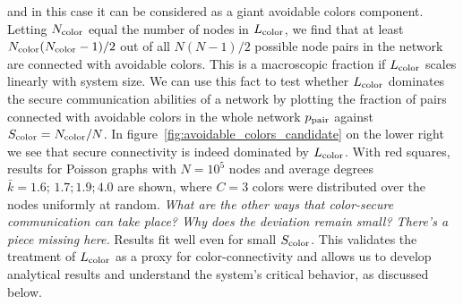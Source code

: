 \documentclass[aps, pre, twocolumn, a4paper, floatfix]{revtex4}
\newcommand{\red}{\color{red}}
\begin{document}
and in this case it can be considered as a giant avoidable colors component. 
Letting $N_{\rm color}$ equal the number of nodes in $L_{\rm color}$,
we find that at least $N_{\rm color}(N_{\rm color}-1)/2$ out of all $N(N-1)/2$ 
possible node pairs in the network are connected with avoidable colors. 
This is a macroscopic fraction if $L_{\rm color}$ scales linearly with system size. 
{\red We can use this fact to test whether $L_{\rm color}$ dominates the secure communication abilities 
of a network by plotting the fraction of pairs connected with avoidable colors in the 
whole network $p_{\rm pair}$ against $S_{\rm color}=N_{\rm color}/N$. 
In figure~\ref{fig:avoidable_colors_candidate} on the lower right we see that secure 
connectivity is indeed dominated by $L_{\rm color}$. 
With red squares, results for Poisson graphs with $N=10^5$ nodes and average degrees 
${\bar k}=1.6;\,1.7;1.9;4.0$ are shown, where $C=3$ colors were distributed over the nodes 
uniformly at random. 
\textit{What are the other ways that color-secure communication can take place? Why does the deviation remain small? There's a piece missing here.}}
Results fit well even for small $S_{\rm color}$. 
This validates the treatment of $L_{\rm color}$ as a proxy for color-connectivity and allows us to develop analytical results and understand the system's critical behavior, as discussed below. 
\end{document}
